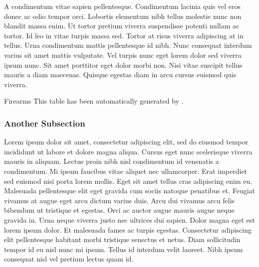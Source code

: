 \documentclass[red, openany, logo-1e]{shadowrun}
\begin{document}
A condimentum vitae sapien pellentesque. Condimentum lacinia quis vel eros donec ac odio tempor orci. Lobortis elementum nibh tellus molestie nunc non blandit massa enim. Ut tortor pretium viverra suspendisse potenti nullam ac tortor. Id leo in vitae turpis massa sed. Tortor at risus viverra adipiscing at in tellus. Urna condimentum mattis pellentesque id nibh. Nunc consequat interdum varius sit amet mattis vulputate. Vel turpis nunc eget lorem dolor sed viverra ipsum nunc. Sit amet porttitor eget dolor morbi non. Nisi vitae suscipit tellus mauris a diam maecenas. Quisque egestas diam in arcu cursus euismod quis viverra.



\begin{srbigtable}[htbp]{Firearms}
    This table has been automatically generated by \string\newcollection.

    \weaponTableOut
\end{srbigtable}

\subsubsection{Another Subsection}
Lorem ipsum dolor sit amet, consectetur adipiscing elit, sed do eiusmod tempor incididunt ut labore et dolore magna aliqua. Cursus eget nunc scelerisque viverra mauris in aliquam. Lectus proin nibh nisl condimentum id venenatis a condimentum. Mi ipsum faucibus vitae aliquet nec ullamcorper. Erat imperdiet sed euismod nisi porta lorem mollis. Eget sit amet tellus cras adipiscing enim eu. Malesuada pellentesque elit eget gravida cum sociis natoque penatibus et. Feugiat vivamus at augue eget arcu dictum varius duis. Arcu dui vivamus arcu felis bibendum ut tristique et egestas. Orci ac auctor augue mauris augue neque gravida in. Urna neque viverra justo nec ultrices dui sapien. Dolor magna eget est lorem ipsum dolor. Et malesuada fames ac turpis egestas. Consectetur adipiscing elit pellentesque habitant morbi tristique senectus et netus. Diam sollicitudin tempor id eu nisl nunc mi ipsum. Tellus id interdum velit laoreet. Nibh ipsum consequat nisl vel pretium lectus quam id.
\end{document}

